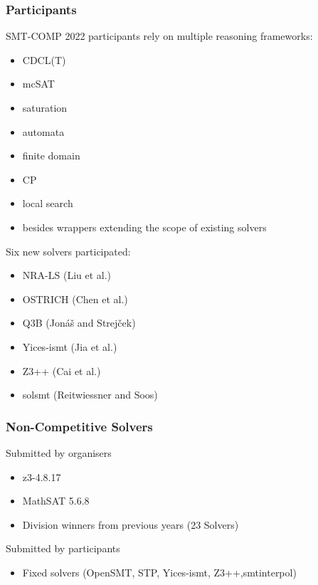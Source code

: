 \documentclass[table]{beamer}
\begin{document}
\begin{frame}
  \frametitle{Participants}

  SMT-COMP 2022 participants rely on multiple reasoning frameworks:
  \begin{itemize}
  \item CDCL(T)
  \item mcSAT
  \item saturation
  \item automata
  \item finite domain
  \item CP
  \item local search
  \item besides wrappers extending the scope of existing solvers
  \end{itemize}

  \bigskip
  Six new solvers participated:
  \begin{itemize}
  \item NRA-LS   {\footnotesize (Liu et al.)}
  \item OSTRICH {\footnotesize (Chen et al.)}
  \item Q3B {\footnotesize (Jon\'a\v{s} and Strej\v{c}ek)}
  \item Yices-ismt {\footnotesize (Jia et al.)}
  \item Z3++ {\footnotesize (Cai et al.)}
  \item solsmt {\footnotesize (Reitwiessner and Soos)}
  \end{itemize}

\end{frame}


\begin{frame}
  \frametitle{Non-Competitive Solvers}

  Submitted by organisers
  \begin{itemize}
  \item z3-4.8.17
  \item MathSAT 5.6.8
  \item Division winners from previous years (23 Solvers)
  \end{itemize}
  \bigskip

  Submitted by participants
  \begin{itemize}
  \item Fixed solvers (OpenSMT, STP, Yices-ismt, Z3++,smtinterpol)
  \end{itemize}
\end{frame}
\end{document}
